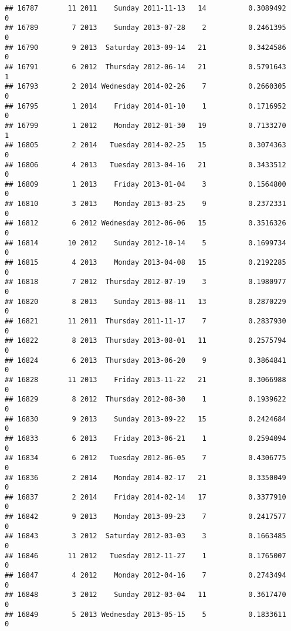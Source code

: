 \documentclass[
]{article}
\begin{document}
\begin{verbatim}
## 16787       11 2011    Sunday 2011-11-13   14          0.3089492             0
## 16789        7 2013    Sunday 2013-07-28    2          0.2461395             0
## 16790        9 2013  Saturday 2013-09-14   21          0.3424586             0
## 16791        6 2012  Thursday 2012-06-14   21          0.5791643             1
## 16793        2 2014 Wednesday 2014-02-26    7          0.2660305             0
## 16795        1 2014    Friday 2014-01-10    1          0.1716952             0
## 16799        1 2012    Monday 2012-01-30   19          0.7133270             1
## 16805        2 2014   Tuesday 2014-02-25   15          0.3074363             0
## 16806        4 2013   Tuesday 2013-04-16   21          0.3433512             0
## 16809        1 2013    Friday 2013-01-04    3          0.1564800             0
## 16810        3 2013    Monday 2013-03-25    9          0.2372331             0
## 16812        6 2012 Wednesday 2012-06-06   15          0.3516326             0
## 16814       10 2012    Sunday 2012-10-14    5          0.1699734             0
## 16815        4 2013    Monday 2013-04-08   15          0.2192285             0
## 16818        7 2012  Thursday 2012-07-19    3          0.1980977             0
## 16820        8 2013    Sunday 2013-08-11   13          0.2870229             0
## 16821       11 2011  Thursday 2011-11-17    7          0.2837930             0
## 16822        8 2013  Thursday 2013-08-01   11          0.2575794             0
## 16824        6 2013  Thursday 2013-06-20    9          0.3864841             0
## 16828       11 2013    Friday 2013-11-22   21          0.3066988             0
## 16829        8 2012  Thursday 2012-08-30    1          0.1939622             0
## 16830        9 2013    Sunday 2013-09-22   15          0.2424684             0
## 16833        6 2013    Friday 2013-06-21    1          0.2594094             0
## 16834        6 2012   Tuesday 2012-06-05    7          0.4306775             0
## 16836        2 2014    Monday 2014-02-17   21          0.3350049             0
## 16837        2 2014    Friday 2014-02-14   17          0.3377910             0
## 16842        9 2013    Monday 2013-09-23    7          0.2417577             0
## 16843        3 2012  Saturday 2012-03-03    3          0.1663485             0
## 16846       11 2012   Tuesday 2012-11-27    1          0.1765007             0
## 16847        4 2012    Monday 2012-04-16    7          0.2743494             0
## 16848        3 2012    Sunday 2012-03-04   11          0.3617470             0
## 16849        5 2013 Wednesday 2013-05-15    5          0.1833611             0

\end{verbatim}
\end{document}
